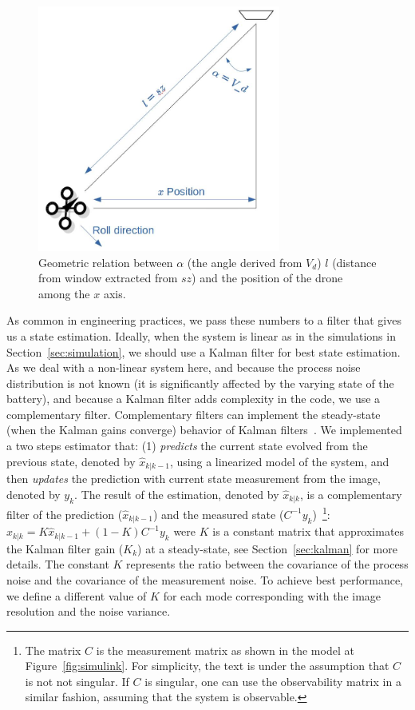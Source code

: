 \documentclass[ twoside, 12pt ]{article}
\begin{document}
\begin{figure} %
    \centerline{\includegraphics[width=80mm]{vd-geometry.jpg}}
    \caption{Geometric relation between $\alpha$ (the angle derived from $V_d$) $l$ (distance from window extracted from $sz$) and the position of the drone among the $x$ axis.}
    \label{fig:V_d-geomerty}
\end{figure}


As common in engineering practices, we pass these numbers to a filter that gives us a state estimation. 
Ideally, when the system is linear as in the simulations in Section~\ref{sec:simulation}, we should use a Kalman filter for best state estimation. As we deal with a non-linear system here, and because the process noise distribution is not known (it is significantly affected by the varying state of the battery), and because a Kalman filter adds complexity in the code, we use a complementary filter.
Complementary filters can implement the steady-state (when the Kalman gains converge) behavior of Kalman filters~\cite{complementaryVSKalman}.
We implemented a two steps estimator that: (1) \textit{predicts} the current state evolved from the previous state, denoted by $\hat{x}_{k|k-1}$, using a linearized model of the system, and then \textit{updates} the prediction with current state measurement from the image, denoted by $y_k$.
The result of the estimation, denoted by $\hat{x}_{k|k}$, is a complementary filter of the prediction ($\hat{x}_{k|k-1}$) and the measured state ($C^{-1}y_k$)~\footnote{The matrix $C$ is the measurement matrix as shown in the model at Figure~\ref{fig:simulink}. For simplicity, the text is under the assumption that $C$ is not not singular. If $C$ is singular, one can use the observability matrix in a similar fashion, assuming that the system is observable.}:
$ \hat{x}_{k|k} = K \hat{x}_{k|k-1} + (1-K) C^{-1}y_k $ were $K$ is a constant matrix that approximates the Kalman filter gain ($K_k$) at a steady-state, see Section~\ref{sec:kalman} for more details.
The constant $K$ represents the ratio between the covariance of the process noise and the covariance of the measurement noise. To achieve best performance, we define a different value of $K$ for each mode corresponding with the image resolution and the noise variance.
\end{document}
